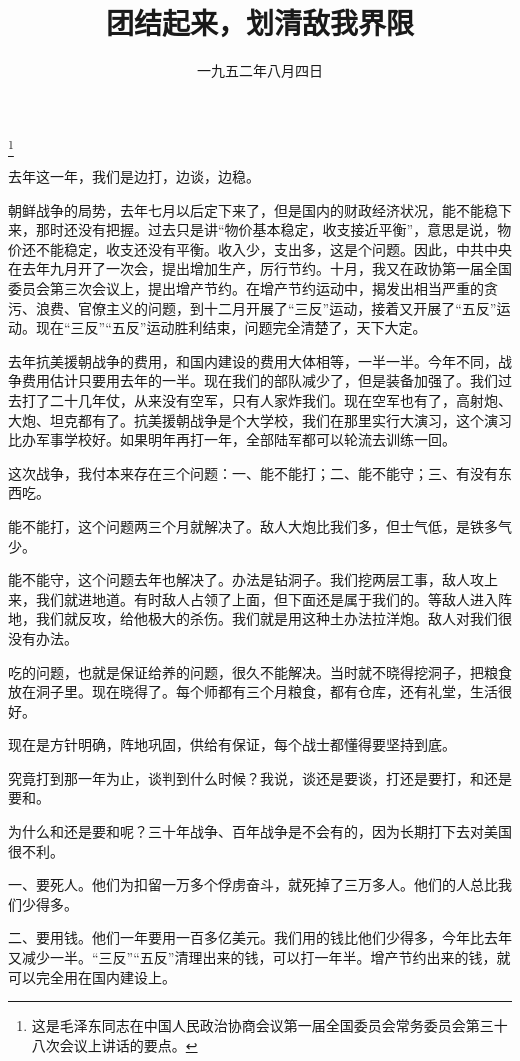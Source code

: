 
\title{团结起来，划清敌我界限}
\date{一九五二年八月四日}
\thanks{这是毛泽东同志在中国人民政治协商会议第一届全国委员会常务委员会第三十八次会议上讲话的要点。}
\maketitle


去年这一年，我们是边打，边谈，边稳。

朝鲜战争的局势，去年七月以后定下来了，但是国内的财政经济状况，能不能稳下来，那时还没有把握。过去只是讲“物价基本稳定，收支接近平衡”，意思是说，物价还不能稳定，收支还没有平衡。收入少，支出多，这是个问题。因此，中共中央在去年九月开了一次会，提出增加生产，厉行节约。十月，我又在政协第一届全国委员会第三次会议上，提出增产节约。在增产节约运动中，揭发出相当严重的贪污、浪费、官僚主义的问题，到十二月开展了“三反”运动，接着又开展了“五反”运动。现在“三反”“五反”运动胜利结束，问题完全清楚了，天下大定。

去年抗美援朝战争的费用，和国内建设的费用大体相等，一半一半。今年不同，战争费用估计只要用去年的一半。现在我们的部队减少了，但是装备加强了。我们过去打了二十几年仗，从来没有空军，只有人家炸我们。现在空军也有了，高射炮、大炮、坦克都有了。抗美援朝战争是个大学校，我们在那里实行大演习，这个演习比办军事学校好。如果明年再打一年，全部陆军都可以轮流去训练一回。

这次战争，我付本来存在三个问题：一、能不能打；二、能不能守；三、有没有东西吃。

能不能打，这个问题两三个月就解决了。敌人大炮比我们多，但士气低，是铁多气少。

能不能守，这个问题去年也解决了。办法是钻洞子。我们挖两层工事，敌人攻上来，我们就进地道。有时敌人占领了上面，但下面还是属于我们的。等敌人进入阵地，我们就反攻，给他极大的杀伤。我们就是用这种土办法拉洋炮。敌人对我们很没有办法。

吃的问题，也就是保证给养的问题，很久不能解决。当时就不晓得挖洞子，把粮食放在洞子里。现在晓得了。每个师都有三个月粮食，都有仓库，还有礼堂，生活很好。

现在是方针明确，阵地巩固，供给有保证，每个战士都懂得要坚持到底。

究竟打到那一年为止，谈判到什么时候？我说，谈还是要谈，打还是要打，和还是要和。

为什么和还是要和呢？三十年战争、百年战争是不会有的，因为长期打下去对美国很不利。

一、要死人。他们为扣留一万多个俘虏奋斗，就死掉了三万多人。他们的人总比我们少得多。

二、要用钱。他们一年要用一百多亿美元。我们用的钱比他们少得多，今年比去年又减少一半。“三反”“五反”清理出来的钱，可以打一年半。增产节约出来的钱，就可以完全用在国内建设上。

